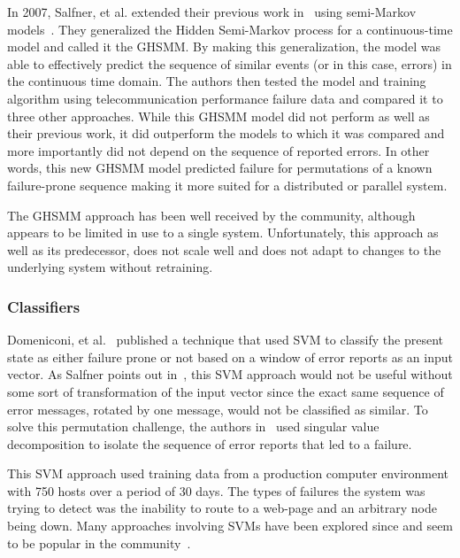 In 2007, Salfner, et al. extended their previous work in~\cite{salfner2006}
using semi-Markov models~\cite{salfner2007}.  They generalized the Hidden
Semi-Markov process for a continuous-time model and called it the \ac{GHSMM}.
By making this generalization, the model was able to effectively predict the
sequence of similar events (or in this case, errors) in the continuous time
domain.  The authors then tested the model and training algorithm using
telecommunication performance failure data and compared it to three other
approaches.  While this \ac{GHSMM} model did not perform as well as their
previous work, it did outperform the models to which it was compared and more
importantly did not depend on the sequence of reported errors.  In other words,
this new \ac{GHSMM} model predicted failure for permutations of a known
failure-prone sequence making it more suited for a distributed or parallel
system.

The \ac{GHSMM} approach has been well received by the community, although
appears to be limited in use to a single system.  Unfortunately, this approach
as well as its predecessor, does not scale well and does not adapt to changes
to the underlying system without retraining.

\subsubsection{Classifiers}
Domeniconi, et al.~\cite{domeniconi2002} published a technique that used
\ac{SVM} to classify the present state as either failure prone or not based on
a window of error reports as an input vector.  As Salfner points out
in~\cite{salfnerSurvey}, this \ac{SVM} approach would not be useful without
some sort of transformation of the input vector since the exact same sequence
of error messages, rotated by one message, would not be classified as similar.
To solve this permutation challenge, the authors in~\cite{domeniconi2002} used
singular value decomposition to isolate the sequence of error reports that led
to a failure.

This \ac{SVM} approach used training data from a production computer
environment with 750 hosts over a period of 30 days.  The types of failures the
system was trying to detect was the inability to route to a web-page and an
arbitrary node being down.  Many approaches involving \ac{SVM}s have been
explored since and seem to be popular in the community~\cite{fronza2013,
fulp2008, murray2005, domeniconi2002, irrera2015}.

